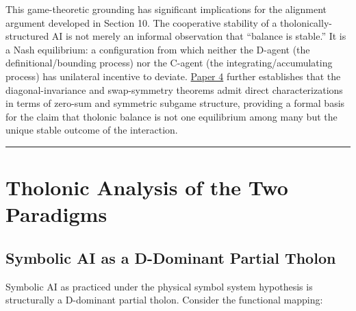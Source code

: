 \documentclass[12pt]{article}
\begin{document}
This game-theoretic grounding has significant implications for the
alignment argument developed in Section 10. The cooperative stability of
a tholonically-structured AI is not merely an informal observation that
``balance is stable.'' It is a Nash equilibrium: a configuration from
which neither the D-agent (the definitional/bounding process) nor the
C-agent (the integrating/accumulating process) has unilateral incentive
to deviate.
\href{https://github.com/baardev/truevalue/blob/main/docnav/Research/papers/4_game-theoretic-triadic-balance/4_game-theoretic-triadic-balance.pdf}{Paper
4} further establishes that the diagonal-invariance and swap-symmetry
theorems admit direct characterizations in terms of zero-sum and
symmetric subgame structure, providing a formal basis for the claim that
tholonic balance is not one equilibrium among many but the unique stable
outcome of the interaction.

\begin{center}\rule{0.5\linewidth}{0.5pt}\end{center}

\section{Tholonic Analysis of the Two Paradigms}\label{tholonic-analysis-of-the-two-paradigms}

\subsection{Symbolic AI as a D-Dominant Partial Tholon}\label{symbolic-ai-as-a-d-dominant-partial-tholon}

Symbolic AI as practiced under the physical symbol system hypothesis is
structurally a D-dominant partial tholon. Consider the functional
mapping:
\end{document}
